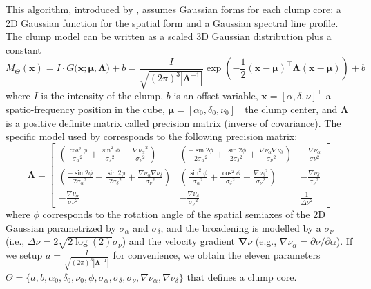 \documentclass[manuscript]{aastex}
\newcommand{\vl}[1]{{\mathbf #1}}
\newcommand{\vs}[1]{{\boldsymbol #1}}
\begin{document}
This algorithm, introduced by \citep{Stutzki}, assumes Gaussian forms for 
each clump core: a 2D Gaussian function for the spatial form and a
Gaussian spectral line profile. The clump model can be written as a scaled 
3D Gaussian distribution plus a constant
\begin{equation}
M_\Theta(\vl{x})=I\cdot{G(\vl{x};\vs{\mu},\vs{\Lambda}}) + b  =\frac{I}{\sqrt{(2\pi)^3|\vs{\Lambda}^{-1}|}}
\exp\left(-\frac{1}{2}({\vl{x}}-{\vs{\mu}})^\top{\vs{\Lambda}}({\vl{x}}-{\vs{\mu}})\right)
+ b
\end{equation}
where $I$ is the intensity of the clump, $b$ is an offset variable, 
$\vl{x} = [ \alpha,\delta,\nu ]^\top$
a spatio-frequency position in the cube, $\vs{\mu} = [ \alpha_0,\delta_0,\nu_0
]^\top$ the 
clump center, and $\vs{\Lambda}$ is a positive definite matrix called precision
matrix (inverse of covariance). The specific model used by \citet{Stutzki} corresponds to the
following precision matrix:
\begin{equation}
\vs{\Lambda} =
\left[ \begin{array}{ccc}
\left(\frac{\cos^2\phi}{{\sigma_\alpha}^2} + \frac{\sin^2\phi}{{\sigma_\delta}^2} +
\frac{{\nabla \nu_\alpha}^2}{{\sigma_\nu}^2}\right) &
\left(\frac{-\sin2\phi}{2{\sigma_\alpha}^2} + \frac{\sin2\phi}{2{\sigma_\delta}^2} +
\frac{{\nabla \nu_\alpha} {\nabla \nu_\delta} }{{\sigma_\nu}^2}\right) & 
- \frac{{\nabla \nu_\alpha}}{{\sigma\nu}^2}  \\
\left(\frac{-\sin2\phi}{2{\sigma_\alpha}^2} +
\frac{\sin2\phi}{2{\sigma_\delta}^2} +
\frac{{\nabla \nu_\alpha} {\nabla \nu_\delta} }{{\sigma_\nu}^2}\right) & 
\left(\frac{\sin^2\phi}{{\sigma_\alpha}^2} + \frac{\cos^2\phi}{{\sigma_\delta}^2} +
\frac{{\nabla \nu_\delta}^2}{{\sigma_\nu}^2} \right) &
- \frac{{\nabla \nu_\delta}}{{\sigma_\nu}^2} \\
- \frac{{\nabla \nu_\alpha}}{{\sigma\nu}^2} &
- \frac{{\nabla \nu_\delta}}{{\sigma_\nu}^2} &
\frac{1}{{\Delta \nu}^2}
\end{array} \right]
\end{equation}
where $\phi$ corresponds to the rotation angle of the spatial semiaxes of the
2D Gaussian parametrized by $\sigma_\alpha$ and $\sigma_\delta$, and the
broadening is modelled by a $\sigma_\nu$ (i.e., $\Delta \nu=2\sqrt{2\log(2)} \sigma_\nu$)
and the velocity gradient $\vs{\nabla\nu}$ (e.g., $\nabla\nu_\alpha = \partial
\nu/\partial\alpha $). If we setup $a=\frac{I}{\sqrt{(2\pi)^3|\vs{\Lambda}^{-1}|}}$
for convenience, we obtain the eleven parameters $\Theta=
\{a,b,\alpha_0,\delta_0,\nu_0,\phi,\sigma_\alpha,\sigma_\delta, \sigma_\nu,
\nabla\nu_\alpha,\nabla\nu_\delta\}$ that defines a clump core.
\end{document}
